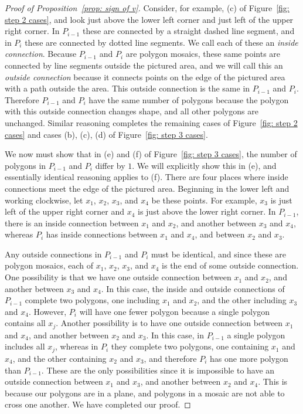 \documentclass[12pt]{article}
\theoremstyle{plain}
\theoremstyle{remark}
\theoremstyle{definition}
\theoremstyle{remark}
\theoremstyle{definition}
\begin{document}
\begin{proof}[Proof of Proposition~\ref{prop: sign of v}]
Consider, for example, (c) of Figure~\ref{fig: step 2 cases}, and look just above the lower left corner and just left of the upper right corner. In $P_{i-1}$ these are connected by a straight dashed line segment, and in $P_{i}$ these are connected by dotted line segments. We call each of these an \emph{inside connection}. Because $P_{i-1}$ and $P_{i}$ are polygon mosaics, these same points are connected by line segments outside the pictured area, and we will call this an \emph{outside connection} because it connects points on the edge of the pictured area with a path outside the area. This outside connection is the same in $P_{i-1}$ and $P_{i}$. Therefore $P_{i-1}$ and $P_{i}$ have the same number of polygons because the polygon with this outside connection changes shape, and all other polygons are unchanged. Similar reasoning completes the remaining cases of Figure~\ref{fig: step 2 cases} and cases (b), (c), (d) of Figure~\ref{fig: step 3 cases}.

We now must show that in (e) and (f) of Figure~\ref{fig: step 3 cases}, the number of polygons in $P_{i-1}$ and $P_{i}$ differ by $1$. We will explicitly show this in (e), and essentially identical reasoning applies to (f). There are four places where inside connections meet the edge of the pictured area. Beginning in the lower left and working clockwise, let $x_{1}$, $x_{2}$, $x_{3}$, and $x_{4}$ be these points. For example, $x_{3}$ is just left of the upper right corner and $x_{4}$ is just above the lower right corner. In $P_{i-1}$, there is an inside connection between $x_{1}$ and $x_{2}$, and another between $x_{3}$ and $x_{4}$, whereas $P_{i}$ has inside connections between $x_{1}$ and $x_{4}$, and between $x_{2}$ and $x_{3}$.

Any outside connections in $P_{i-1}$ and $P_{i}$ must be identical, and since these are polygon mosaics, each of $x_{1}$, $x_{2}$, $x_{3}$, and $x_{4}$ is the end of some outside connection. One possibility is that we have one outside connection between $x_{1}$ and $x_{2}$, and another between $x_{3}$ and $x_{4}$. In this case, the inside and outside connections of $P_{i-1}$ complete two polygons, one including $x_{1}$ and $x_{2}$, and the other including $x_{3}$ and $x_{4}$. However, $P_{i}$ will have one fewer polygon because a single polygon contains all $x_{j}$. Another possibility is to have one outside connection between $x_{1}$ and $x_{4}$, and another between $x_{2}$ and $x_{3}$. In this case, in $P_{i-1}$ a single polygon includes all $x_{j}$, whereas in $P_{i}$ they complete two polygons, one containing $x_{1}$ and $x_{4}$, and the other containing $x_{2}$ and $x_{3}$, and therefore $P_{i}$ has one more polygon than $P_{i-1}$. These are the only possibilities since it is impossible to have an outside connection between $x_{1}$ and $x_{3}$, and another between $x_{2}$ and $x_{4}$. This is because our polygons are in a plane, and polygons in a mosaic are not able to cross one another. We have completed our proof.
\end{proof}
\end{document}
